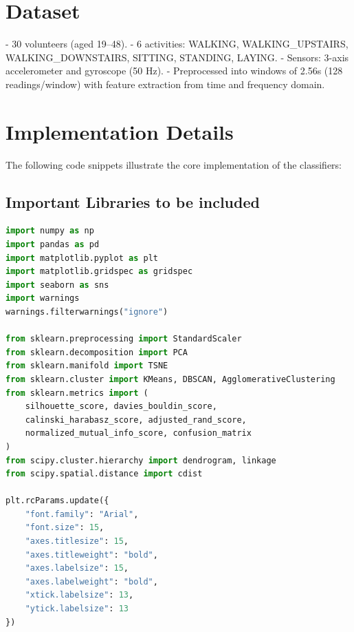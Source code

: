 \documentclass[11pt]{article}
\begin{document}
\section{Dataset}
- 30 volunteers (aged 19–48).  
- 6 activities: WALKING, WALKING\_UPSTAIRS, WALKING\_DOWNSTAIRS, SITTING, STANDING, LAYING.  
- Sensors: 3-axis accelerometer and gyroscope (50 Hz).  
- Preprocessed into windows of 2.56s (128 readings/window) with feature extraction from time and frequency domain.  

\section{Implementation Details}
The following code snippets illustrate the core implementation of the classifiers:

\subsection*{Important Libraries to be included}
\begin{lstlisting}[language=Python]
import numpy as np
import pandas as pd
import matplotlib.pyplot as plt
import matplotlib.gridspec as gridspec
import seaborn as sns
import warnings
warnings.filterwarnings("ignore")
 
from sklearn.preprocessing import StandardScaler
from sklearn.decomposition import PCA
from sklearn.manifold import TSNE
from sklearn.cluster import KMeans, DBSCAN, AgglomerativeClustering
from sklearn.metrics import (
    silhouette_score, davies_bouldin_score,
    calinski_harabasz_score, adjusted_rand_score,
    normalized_mutual_info_score, confusion_matrix
)
from scipy.cluster.hierarchy import dendrogram, linkage
from scipy.spatial.distance import cdist

plt.rcParams.update({
    "font.family": "Arial",
    "font.size": 15,
    "axes.titlesize": 15,
    "axes.titleweight": "bold",
    "axes.labelsize": 15,
    "axes.labelweight": "bold",
    "xtick.labelsize": 13,
    "ytick.labelsize": 13
})
\end{lstlisting}
\end{document}
